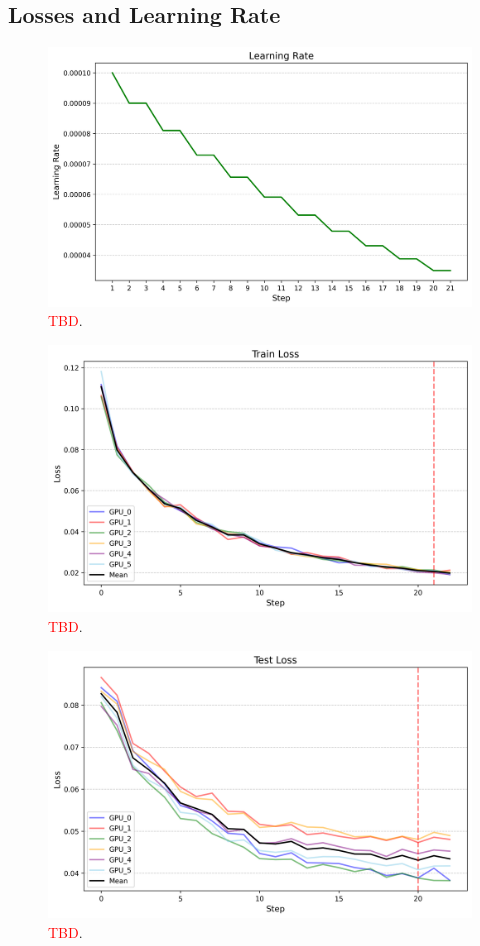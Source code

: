 \subsection{Losses and Learning Rate}\label{seclr}
\begin{figure}[H]
	\centering
	\includegraphics[width=\textwidth]{"images/lr.png"}
	\caption[Learning rate]{\textcolor{red}{TBD}.}
	\label{figlr}
\end{figure}
\begin{figure}[H]
	\centering
	\includegraphics[width=\textwidth]{"images/train_loss.png"}
	\caption[Train loss]{\textcolor{red}{TBD}.}
	\label{figtrainloss}
\end{figure}
\begin{figure}[H]
	\centering
	\includegraphics[width=\textwidth]{"images/test_loss.png"}
	\caption[Test loss]{\textcolor{red}{TBD}.}
	\label{figtestloss}
\end{figure}
